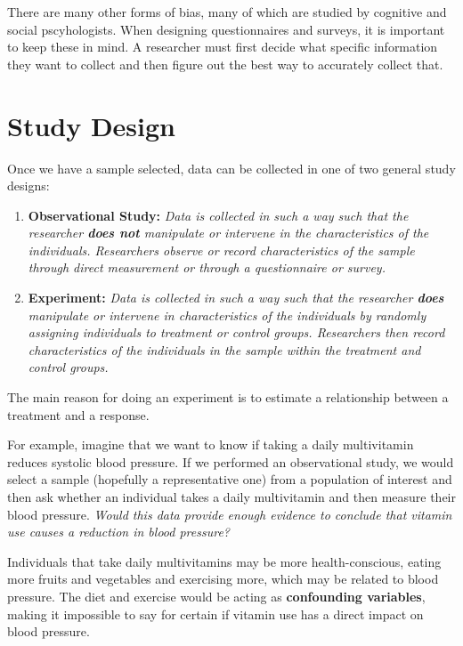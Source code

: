 \documentclass[]{book}
\begin{document}
There are many other forms of bias, many of which are studied by cognitive and social pscyhologists. When designing questionnaires and surveys, it is important to keep these in mind. A researcher must first decide what specific information they want to collect and then figure out the best way to accurately collect that.

\hypertarget{study-design}{%
\section{Study Design}\label{study-design}}

Once we have a sample selected, data can be collected in one of two general study designs:

\begin{enumerate}
\def\labelenumi{\arabic{enumi}.}
\item
  \textbf{Observational Study:} \emph{Data is collected in such a way such that the researcher \textbf{does not} manipulate or intervene in the characteristics of the individuals. Researchers observe or record characteristics of the sample through direct measurement or through a questionnaire or survey.}
\item
  \textbf{Experiment:} \emph{Data is collected in such a way such that the researcher \textbf{does} manipulate or intervene in characteristics of the individuals by randomly assigning individuals to treatment or control groups. Researchers then record characteristics of the individuals in the sample within the treatment and control groups.}
\end{enumerate}

The main reason for doing an experiment is to estimate a relationship between a treatment and a response.

For example, imagine that we want to know if taking a daily multivitamin reduces systolic blood pressure. If we performed an observational study, we would select a sample (hopefully a representative one) from a population of interest and then ask whether an individual takes a daily multivitamin and then measure their blood pressure. \emph{Would this data provide enough evidence to conclude that vitamin use causes a reduction in blood pressure?}

Individuals that take daily multivitamins may be more health-conscious, eating more fruits and vegetables and exercising more, which may be related to blood pressure. The diet and exercise would be acting as \textbf{confounding variables}, making it impossible to say for certain if vitamin use has a direct impact on blood pressure.
\end{document}

